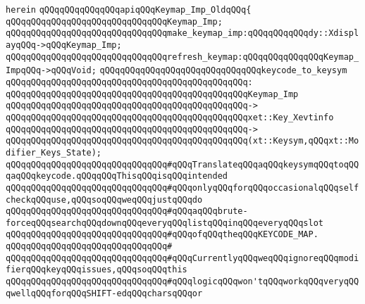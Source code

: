 \verb|herein|\newline
\newline
\verb|qQQqqQQqqQQqqQQqapiqQQqKeymap_Imp_OldqQQq{|\newline
\newline
\verb|qQQqqQQqqQQqqQQqqQQqqQQqqQQqqQQqKeymap_Imp;|\newline
\newline
\verb|qQQqqQQqqQQqqQQqqQQqqQQqqQQqqQQqmake_keymap_imp:qQQqqQQqqQQqdy::XdisplayqQQq->qQQqKeymap_Imp;|\newline
\newline
\verb|qQQqqQQqqQQqqQQqqQQqqQQqqQQqqQQqrefresh_keymap:qQQqqQQqqQQqqQQqKeymap_ImpqQQq->qQQqVoid;|\newline
\newline
\verb|qQQqqQQqqQQqqQQqqQQqqQQqqQQqqQQqkeycode_to_keysym|\newline
\verb|qQQqqQQqqQQqqQQqqQQqqQQqqQQqqQQqqQQqqQQqqQQqqQQq:|\newline
\verb|qQQqqQQqqQQqqQQqqQQqqQQqqQQqqQQqqQQqqQQqqQQqqQQqKeymap_Imp|\newline
\verb|qQQqqQQqqQQqqQQqqQQqqQQqqQQqqQQqqQQqqQQqqQQqqQQq->|\newline
\verb|qQQqqQQqqQQqqQQqqQQqqQQqqQQqqQQqqQQqqQQqqQQqqQQqxet::Key_Xevtinfo|\newline
\verb|qQQqqQQqqQQqqQQqqQQqqQQqqQQqqQQqqQQqqQQqqQQqqQQq->|\newline
\verb|qQQqqQQqqQQqqQQqqQQqqQQqqQQqqQQqqQQqqQQqqQQqqQQq(xt::Keysym,qQQqxt::Modifier_Keys_State);|\newline
\newline
\verb|qQQqqQQqqQQqqQQqqQQqqQQqqQQqqQQq#qQQqTranslateqQQqaqQQqkeysymqQQqtoqQQqaqQQqkeycode.qQQqqQQqThisqQQqisqQQqintended|\newline
\verb|qQQqqQQqqQQqqQQqqQQqqQQqqQQqqQQq#qQQqonlyqQQqforqQQqoccasionalqQQqselfcheckqQQquse,qQQqsoqQQqweqQQqjustqQQqdo|\newline
\verb|qQQqqQQqqQQqqQQqqQQqqQQqqQQqqQQq#qQQqaqQQqbrute-forceqQQqsearchqQQqdownqQQqeveryqQQqlistqQQqinqQQqeveryqQQqslot|\newline
\verb|qQQqqQQqqQQqqQQqqQQqqQQqqQQqqQQq#qQQqofqQQqtheqQQqKEYCODE_MAP.|\newline
\verb|qQQqqQQqqQQqqQQqqQQqqQQqqQQqqQQq#|\newline
\verb|qQQqqQQqqQQqqQQqqQQqqQQqqQQqqQQq#qQQqCurrentlyqQQqweqQQqignoreqQQqmodifierqQQqkeyqQQqissues,qQQqsoqQQqthis|\newline
\verb|qQQqqQQqqQQqqQQqqQQqqQQqqQQqqQQq#qQQqlogicqQQqwon'tqQQqworkqQQqveryqQQqwellqQQqforqQQqSHIFT-edqQQqcharsqQQqor|\newline
